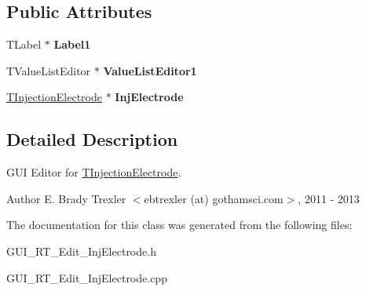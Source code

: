 \subsection*{Public Attributes}
\begin{DoxyCompactItemize}
\item 
\hypertarget{class_t_injection_electrode_form_aba3e4b0bff7fa065b9dccb57face3cd2}{T\+Label $\ast$ {\bfseries Label1}}\label{class_t_injection_electrode_form_aba3e4b0bff7fa065b9dccb57face3cd2}

\item 
\hypertarget{class_t_injection_electrode_form_a43494755a6902dd536d067f904fa8eeb}{T\+Value\+List\+Editor $\ast$ {\bfseries Value\+List\+Editor1}}\label{class_t_injection_electrode_form_a43494755a6902dd536d067f904fa8eeb}

\item 
\hypertarget{class_t_injection_electrode_form_a202b2414858cb3c1485cb11cce2b2433}{\hyperlink{class_t_injection_electrode}{T\+Injection\+Electrode} $\ast$ {\bfseries Inj\+Electrode}}\label{class_t_injection_electrode_form_a202b2414858cb3c1485cb11cce2b2433}

\end{DoxyCompactItemize}


\subsection{Detailed Description}
G\+U\+I Editor for \hyperlink{class_t_injection_electrode}{T\+Injection\+Electrode}. 

\begin{DoxyAuthor}{Author}
E. Brady Trexler $<$ebtrexler (at) gothamsci.\+com$>$, 2011 -\/ 2013 
\end{DoxyAuthor}


The documentation for this class was generated from the following files\+:\begin{DoxyCompactItemize}
\item 
G\+U\+I\+\_\+\+R\+T\+\_\+\+Edit\+\_\+\+Inj\+Electrode.\+h\item 
G\+U\+I\+\_\+\+R\+T\+\_\+\+Edit\+\_\+\+Inj\+Electrode.\+cpp\end{DoxyCompactItemize}
